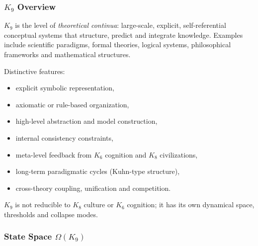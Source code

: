 

\subsubsection{\texorpdfstring{$K_9$}{K_9} Overview}
\label{sec:k9-overview}

$K_9$ is the level of \emph{theoretical continua}: large-scale, explicit,
self-referential conceptual systems that structure, predict and integrate
knowledge. Examples include scientific paradigms, formal theories, logical
systems, philosophical frameworks and mathematical structures.

Distinctive features:
\begin{itemize}
    \item explicit symbolic representation,
    \item axiomatic or rule-based organization,
    \item high-level abstraction and model construction,
    \item internal consistency constraints,
    \item meta-level feedback from $K_6$ cognition and $K_8$ civilizations,
    \item long-term paradigmatic cycles (Kuhn-type structure),
    \item cross-theory coupling, unification and competition.
\end{itemize}

$K_9$ is not reducible to $K_8$ culture or $K_6$ cognition; it has its own
dynamical space, thresholds and collapse modes.

\subsubsection{State Space \texorpdfstring{$\Omega(K_9)$}{\Omega(K_9)}}

